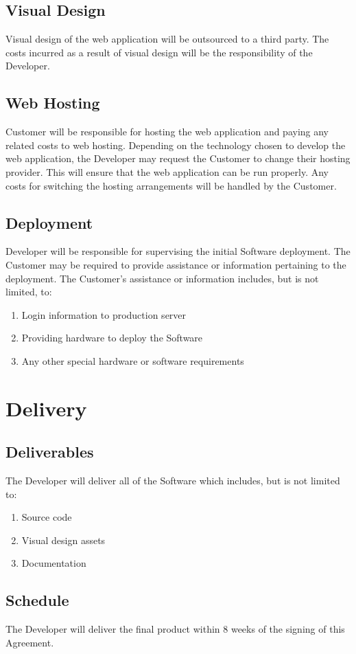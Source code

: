 \documentclass[11pt]{article}
\begin{document}
\subsection{Visual Design}
Visual design of the web application will be outsourced to a third party. The costs incurred as a result of visual design will be the responsibility of the Developer.
\subsection{Web Hosting}
Customer will be responsible for hosting the web application and paying any related costs to web hosting. Depending on the technology chosen to develop the web application, the Developer may request the Customer to change their hosting provider. This will ensure that the web application can be run properly. Any costs for switching the hosting arrangements will be handled by the Customer.
\subsection{Deployment}
Developer will be responsible for supervising the initial Software deployment. The Customer may be required to provide assistance or information pertaining to the deployment. The Customer's assistance or information includes, but is not limited, to:
\begin{enumerate}
\item Login information to production server
\item Providing hardware to deploy the Software
\item Any other special hardware or software requirements 
\end{enumerate}
\section{Delivery}
\subsection{Deliverables}
The Developer will deliver all of the Software which includes, but is not limited to:
\begin{enumerate}
\item Source code
\item Visual design assets 
\item Documentation
\end{enumerate}
\subsection{Schedule}
The Developer will deliver the final product within 8 weeks of the signing of this Agreement. 
\end{document}
